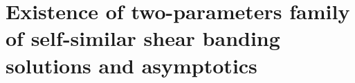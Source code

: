 \documentclass[a4paper,11pt]{article}
\theoremstyle{remark}
\begin{document}
\section{Existence of two-parameters family of self-similar shear banding solutions and asymptotics}
%
%
%
%
%
\end{document}

